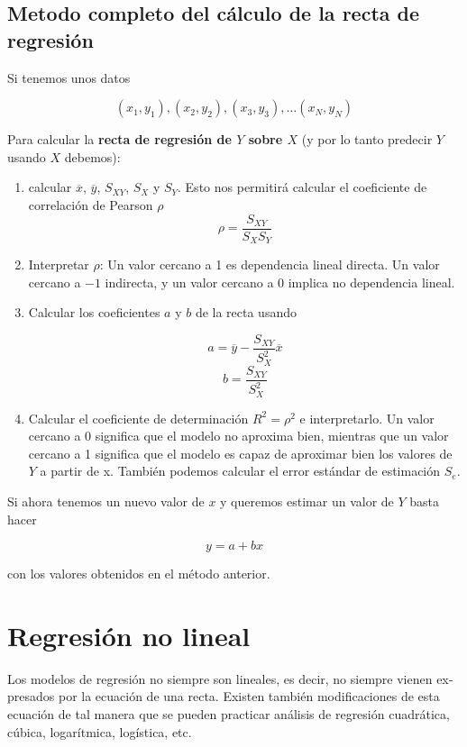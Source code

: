 \documentclass[]{book}
\theoremstyle{plain}
\theoremstyle{definition}
\begin{document}
\hypertarget{metodo-completo-del-cuxe1lculo-de-la-recta-de-regresiuxf3n}{%
\subsection{Metodo completo del cálculo de la recta de
regresión}\label{metodo-completo-del-cuxe1lculo-de-la-recta-de-regresiuxf3n}}

Si tenemos unos datos

\[(x_1, y_1), (x_2, y_2), (x_3,y_3), \ldots (x_N,y_N)\]

Para calcular la \textbf{recta de regresión de \(Y\) sobre \(X\)} (y por
lo tanto predecir \(Y\) usando \(X\) debemos):

\begin{enumerate}
\def\labelenumi{\arabic{enumi}.}
\item
  calcular \(\overline x\), \(\overline y\), \(S_{XY}\), \(S_X\) y
  \(S_Y\). Esto nos permitirá calcular el coeficiente de correlación de
  Pearson \(\rho\) \[\rho = \frac{S_{XY}}{S_X S_Y}\]
\item
  Interpretar \(\rho\): Un valor cercano a 1 es dependencia lineal
  directa. Un valor cercano a \(-1\) indirecta, y un valor cercano a 0
  implica no dependencia lineal.
\item
  Calcular los coeficientes \(a\) y \(b\) de la recta usando

  \[a = \overline{y} - \frac{S_{XY}}{S^2_X} \overline x\]
  \[b = \frac{S_{XY}}{S^2_X}\]
\item
  Calcular el coeficiente de determinación \(R^2 = \rho^2\) e
  interpretarlo. Un valor cercano a 0 significa que el modelo no
  aproxima bien, mientras que un valor cercano a 1 significa que el
  modelo es capaz de aproximar bien los valores de \(Y\) a partir de x.
  También podemos calcular el error estándar de estimación \(S_e\).
\end{enumerate}

Si ahora tenemos un nuevo valor de \(x\) y queremos estimar un valor de
\(Y\) basta hacer

\[y = a + b x\]

con los valores obtenidos en el método anterior.

\hypertarget{regresiuxf3n-no-lineal}{%
\section{Regresión no lineal}\label{regresiuxf3n-no-lineal}}

Los modelos de regresión no siempre son lineales, es decir, no siempre
vienen ex­presados por la ecuación de una recta. Existen también
modificaciones de esta ecuación de tal manera que se pueden practicar
análisis de regresión cuadrática, cúbica, logarít­mica, logística, etc.
\end{document}
